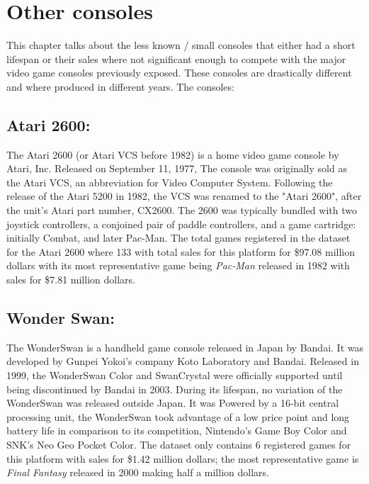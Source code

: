 \section {Other consoles}
This chapter talks about the less known / small consoles that either had a
short lifespan or their sales where not significant enough to compete with
the major video game consoles previously exposed. These consoles are
drastically different and where produced in different years. The consoles:\\

\subsection{Atari 2600:}
The Atari 2600 (or Atari VCS before 1982) is a home video game console by
Atari, Inc. Released on September 11, 1977, The console was originally sold
as the Atari VCS, an abbreviation for Video Computer System. Following the
release of the Atari 5200 in 1982, the VCS was renamed to the "Atari 2600",
after the unit's Atari part number, CX2600. The 2600 was typically bundled
with two joystick controllers, a conjoined pair of paddle controllers, and a
game cartridge: initially Combat, and later Pac-Man\cite{Atari2600}. The
total games registered in the dataset for the Atari 2600 where 133 with total
sales for this platform for \$97.08 million dollars with its most
representative game being \textit{Pac-Man} released in 1982 with sales for
\$7.81 million dollars.

\subsection{Wonder Swan:}
The WonderSwan is a handheld game console released in Japan by Bandai. It was
developed by Gunpei Yokoi's company Koto Laboratory and Bandai. Released in
1999, the WonderSwan Color and SwanCrystal were officially supported until
being discontinued by Bandai in 2003. During its lifespan, no variation of
the WonderSwan was released outside Japan. It was Powered by a 16-bit central
processing unit, the WonderSwan took advantage of a low price point and long
battery life in comparison to its competition, Nintendo's Game Boy Color and
SNK's Neo Geo Pocket Color\cite{WonderSwan}. The dataset only contains 6
registered games for this platform with sales for \$1.42 million dollars; the
most representative game is \textit{Final Fantasy} released in 2000 making
half a million dollars.

